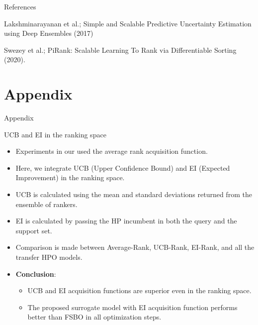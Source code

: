 \documentclass{beamer}
\begin{document}
\begin{frame}[t]{References}

\begin{thebibliography}{1}

\alert{Lakshminarayanan et al.; Simple and Scalable Predictive Uncertainty Estimation using Deep Ensembles (2017)}

\alert{Swezey et al.;  PiRank: Scalable Learning To Rank via Differentiable Sorting (2020).}

\end{thebibliography}

\end{frame}


\section{Appendix}
\begin{frame}
\centering
\LARGE{Appendix}
\end{frame}

\begin{frame}[t]{UCB and EI in the ranking space}
\begin{itemize}
\item Experiments in our used the average rank acquisition function.
\item Here, we integrate UCB (Upper Confidence Bound) and EI (Expected Improvement) in the ranking space.
\item UCB is calculated using the mean and standard deviations returned from the ensemble of rankers.
\item EI is calculated by passing the HP incumbent in both the query and the support set.
\item Comparison is made between Average-Rank,  UCB-Rank,  EI-Rank, and all the transfer HPO models.
\item \textbf{Conclusion}:
\begin{itemize}
\item UCB and EI acquisition functions are superior even in the ranking space. \item The proposed surrogate model with EI  acquisition function performs better than FSBO in all optimization steps.
\end{itemize}
\end{itemize}
\end{frame}
\end{document}
